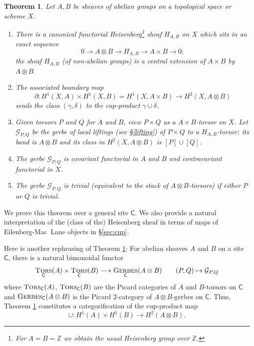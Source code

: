 \documentclass{amsart}
\numberwithin{equation}{subsection}
\newtheorem{theorem}{Theorem}[section]
\theoremstyle{remark}
\theoremstyle{remark}
\newcommand{\too}{\longrightarrow}%
\newcommand{\cG}{\mathcal{G}}
\newcommand{\bbZ}{\mathbb{Z}}
\newcommand{\C}{\mathsf{C}} %
\DeclareMathOperator{\ger}{\textsc{Gerbes}} %
\DeclareMathOperator{\tors}{\textsc{Tors}} %
\begin{document}
\begin{theorem}
  \label{primo}
  Let $A, B$ be sheaves of abelian groups on a topological space or scheme $X$.
  \begin{enumerate}
  \item 
 There is a canonical functorial Heisenberg\footnote{For $A=B=\bbZ$ we obtain the usual Heisenberg group over $\bbZ$.}  sheaf $H_{A,B}$ on $X$ which sits in an exact sequence
 \begin{equation*}
   0 \to A\otimes B \to H_{A,B} \to A \times B \to 0;
 \end{equation*}
 the  sheaf $H_{A,B}$ (of non-abelian groups) is a central extension of $A \times B$ by $A\otimes B$.

\item The associated boundary map
  \begin{equation*}
    \partial: H^1(X, A)\times H^1(X,B) = H^1(X, A \times B) \to H^2(X, A\otimes B)
  \end{equation*}
  sends the class $(\gamma, \delta)$ to the cup-product $\gamma \cup \delta$.
 
\item Given torsors $P$ and $Q$ for $A$ and $B$, view $P\times Q$ as a $A\times B$-torsor on $X$. Let $\cG_{P,Q}$ be the gerbe of local liftings (see \S \ref{lifting}) of $P\times Q$ to a $H_{A,B}$-torsor; its band is $A\otimes B$ and its class in $H^2(X, A\otimes B)$ is $[P]\cup[Q]$. 

\item The gerbe $\cG_{P,Q}$ is covariant functorial in $A$ and $B$ and contravariant functorial in $X$. 
\item The gerbe $\cG_{P,Q}$ is trivial (equivalent to the stack of $A\otimes B$-torsors) if either $P$ or $Q$ is trivial.
\end{enumerate}
\end{theorem}
We prove this theorem over a general site $\C$. We also provide a natural interpretation of the (class of the) Heisenberg sheaf in terms of maps of 
Eilenberg-Mac~Lane objects in \S \ref{sec:cup}. %

Here is another rephrasing of Theorem \ref{primo}: For abelian sheaves $A$ and $B$ on a site $\C$, there is a natural bimonoidal functor 
\begin{equation}\label{bimon} \tors _{\C}(A)\times \tors _{\C}(B) \too \ger _{\C} (A\otimes B) \qquad (P,Q) \mapsto \cG_{P,Q}\end{equation}
where $\tors_{\C}(A)$, $\tors_{\C}(B)$ are the Picard categories of $A$ and $B$-torsors on $\C$ and $\ger_{\C} (A\otimes B)$ is the Picard $2$-category of $A\otimes B$-gerbes on $\C$. Thus, Theorem \ref{primo} constitutes a categorification of the cup-product map 
 \begin{equation}
 \cup: H^1(A) \times H^1(B) \to H^2(A\otimes B).
 \end{equation}
\end{document}
